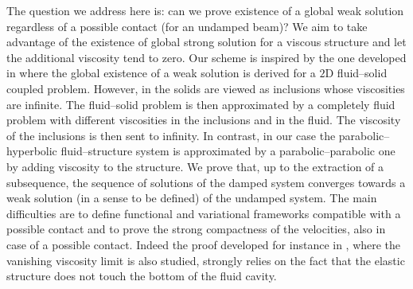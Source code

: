 \documentclass[11pt]{article}
\theoremstyle{remark}
\theoremstyle{definition}
\begin{document}
The question we address here is: can we prove existence of a global weak solution regardless of a possible contact (for an undamped beam)? We aim to take advantage of the existence of global strong solution for a viscous structure and let the additional viscosity tend to zero. Our scheme is inspired by the one developed in \cite{SanMartin-Starovoitov-Tucsnak} where the global existence of a weak solution is derived for a $2$D fluid--solid coupled problem. However, in \cite{SanMartin-Starovoitov-Tucsnak} the solids are viewed as inclusions whose viscosities are infinite. The fluid--solid problem is then approximated by a completely fluid problem with different viscosities in the inclusions and in the fluid. The viscosity of the inclusions is then sent to infinity. In contrast, in our case the parabolic--hyperbolic fluid--structure system is approximated by a parabolic--parabolic one by adding viscosity to the structure. We prove that, up to the extraction of a subsequence, the sequence of solutions of the damped system converges towards a weak solution (in a sense to be defined) of the undamped system. The main difficulties are to define functional and variational frameworks compatible with a possible contact and to prove the strong compactness of the velocities, also in case of a possible contact. Indeed the proof developed for instance in \cite{Grandmont08}, where the vanishing viscosity limit is also studied, strongly relies on the fact that the elastic structure does not touch the bottom of the fluid cavity.
\end{document}

